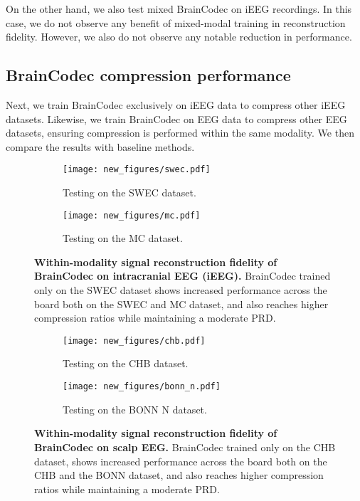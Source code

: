 \documentclass{article} %
\begin{document}
On the other hand, we also test mixed BrainCodec on iEEG recordings. In this case, we do not observe any benefit of mixed-modal training in reconstruction fidelity. However, we also do not observe any notable reduction in performance.



\subsection{BrainCodec compression performance}

Next, we train BrainCodec exclusively on iEEG data to compress other iEEG datasets. Likewise, we train BrainCodec on EEG data to compress other EEG datasets, ensuring compression is performed within the same modality. We then compare the results with baseline methods.

\begin{figure}[ht]
	\begin{subfigure}[t]{.49\textwidth}
		\centering
		\texttt{[image: new\_figures/swec.pdf]}
		\caption{Testing on the SWEC dataset.}
		\label{fig:results_swec}
	\end{subfigure}\hfill
	\begin{subfigure}[t]{.49\textwidth}
		\centering
		\texttt{[image: new\_figures/mc.pdf]}
		\caption{Testing on the MC dataset.}
		\label{fig:results_mc}
	\end{subfigure}
	\caption{\textbf{Within-modality signal reconstruction fidelity of BrainCodec on intracranial EEG (iEEG).} BrainCodec trained only on the SWEC dataset shows increased performance across the board both on the SWEC and MC dataset, and also reaches higher compression ratios while maintaining a moderate PRD.}
\end{figure}
\begin{figure}[ht]
	\begin{subfigure}[t]{.49\textwidth}
		\centering
		\texttt{[image: new\_figures/chb.pdf]}
		\caption{Testing on the CHB dataset.}
		\label{fig:results_chb}
	\end{subfigure}\hfill
	\begin{subfigure}[t]{.49\textwidth}
		\centering
		\texttt{[image: new\_figures/bonn\_n.pdf]}
		\caption{Testing on the BONN N dataset.}
		\label{fig:results_bonn_n}
	\end{subfigure}
	\caption{\textbf{Within-modality signal reconstruction fidelity of BrainCodec on scalp EEG.} BrainCodec trained only on the CHB dataset, shows increased performance across the board both on the CHB and the BONN dataset, and also reaches higher compression ratios while maintaining a moderate PRD.}
\end{figure}
\end{document}
